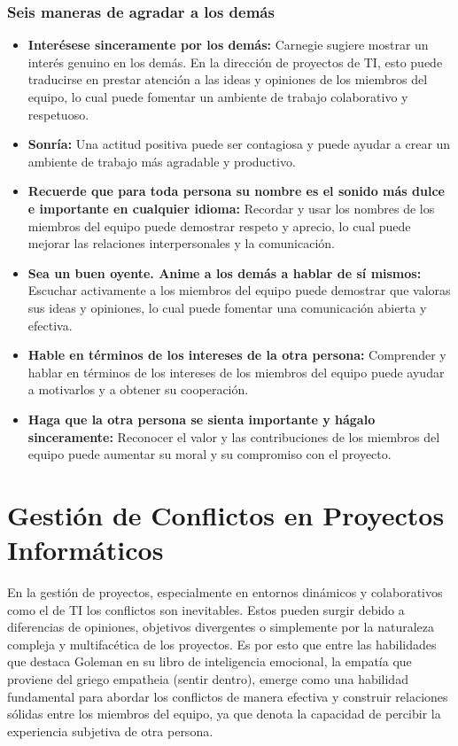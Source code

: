 \documentclass[journal]{IEEEtran}
\begin{document}
\subsubsection{Seis maneras de agradar a los demás}
\begin{itemize}
	\item \textbf{Interésese sinceramente por los demás:} Carnegie sugiere mostrar un interés genuino en los demás. En la dirección de proyectos de TI, esto puede traducirse en prestar atención a las ideas y opiniones de los miembros del equipo, lo cual puede fomentar un ambiente de trabajo colaborativo y respetuoso.
	\item \textbf{Sonría:} Una actitud positiva puede ser contagiosa y puede ayudar a crear un ambiente de trabajo más agradable y productivo.
	\item \textbf{Recuerde que para toda persona su nombre es el sonido más dulce e importante en cualquier idioma:} Recordar y usar los nombres de los miembros del equipo puede demostrar respeto y aprecio, lo cual puede mejorar las relaciones interpersonales y la comunicación.
	\item \textbf{Sea un buen oyente. Anime a los demás a hablar de sí mismos:} Escuchar activamente a los miembros del equipo puede demostrar que valoras sus ideas y opiniones, lo cual puede fomentar una comunicación abierta y efectiva.
	\item \textbf{Hable en términos de los intereses de la otra persona:} Comprender y hablar en términos de los intereses de los miembros del equipo puede ayudar a motivarlos y a obtener su cooperación.
	\item \textbf{Haga que la otra persona se sienta importante y hágalo sinceramente:} Reconocer el valor y las contribuciones de los miembros del equipo puede aumentar su moral y su compromiso con el proyecto.
\end{itemize}

\section{Gestión de Conflictos en Proyectos Informáticos}
En la gestión de proyectos, especialmente en entornos dinámicos y colaborativos como el de TI los conflictos son inevitables. Estos pueden surgir debido a diferencias de opiniones, objetivos divergentes o simplemente por la naturaleza compleja y multifacética de los proyectos. Es por esto que entre las habilidades que destaca Goleman en su libro de inteligencia emocional, la empatía que proviene del griego empatheia (sentir dentro), emerge como una habilidad fundamental para abordar los conflictos de manera efectiva y construir relaciones sólidas entre los miembros del equipo, ya que denota la capacidad de percibir la experiencia subjetiva de otra persona.
\end{document}
